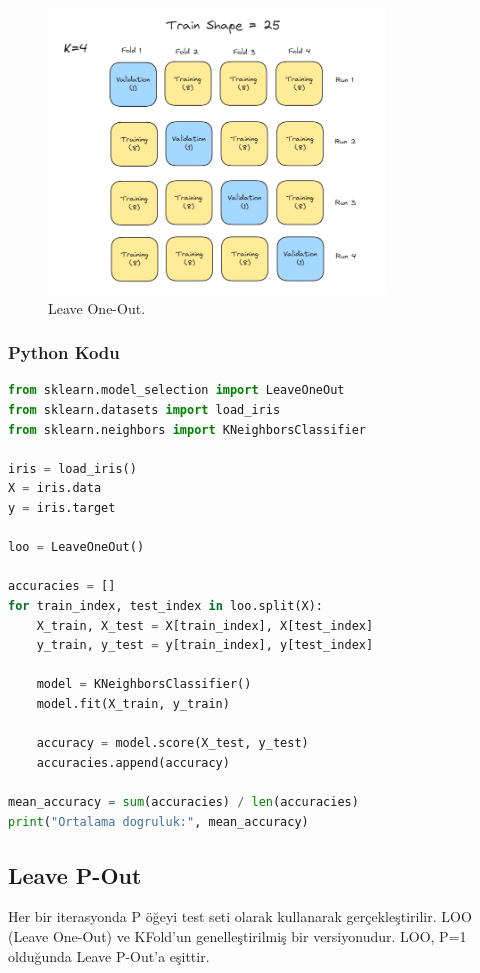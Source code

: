 \begin{figure}[h]
    \centering
    \includegraphics[width=0.8\textwidth]{images/leave_one_out_structure.png}
    \caption{Leave One-Out.}
    \label{fig:enter-label}
\end{figure}

\subsubsection{Python Kodu}

\begin{lstlisting}[language=Python, caption=Scikit-learn'de Leave One-Out örneği.]
from sklearn.model_selection import LeaveOneOut
from sklearn.datasets import load_iris
from sklearn.neighbors import KNeighborsClassifier

iris = load_iris()
X = iris.data
y = iris.target

loo = LeaveOneOut()

accuracies = []
for train_index, test_index in loo.split(X):
    X_train, X_test = X[train_index], X[test_index]
    y_train, y_test = y[train_index], y[test_index]
    
    model = KNeighborsClassifier()
    model.fit(X_train, y_train)
    
    accuracy = model.score(X_test, y_test)
    accuracies.append(accuracy)

mean_accuracy = sum(accuracies) / len(accuracies)
print("Ortalama dogruluk:", mean_accuracy)
\end{lstlisting}

\newpage

\subsection{Leave P-Out}
Her bir iterasyonda P öğeyi test seti olarak kullanarak gerçekleştirilir. LOO (Leave One-Out) ve KFold'un genelleştirilmiş bir versiyonudur. LOO, P=1 olduğunda Leave P-Out'a eşittir.

